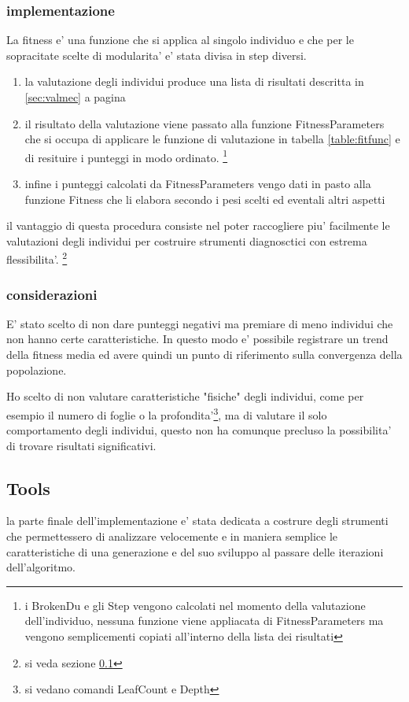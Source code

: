\documentclass[12pt, a4paper]{article}
\begin{document}
\subsubsection{implementazione}
La fitness e' una funzione che si applica al singolo individuo e che per le sopracitate scelte di modularita' e' stata divisa in step diversi.
\begin{enumerate}
\item la valutazione degli individui produce una lista di risultati descritta in \ref{sec:valmec} a pagina \pageref{sec:valmec}
\item il risultato della valutazione viene passato alla funzione FitnessParameters che si occupa di applicare le funzione di valutazione in tabella \ref{table:fitfunc} e di resituire i punteggi in modo ordinato.
\footnote{i BrokenDu e gli Step vengono calcolati nel momento della valutazione dell'individuo, nessuna funzione viene appliacata di FitnessParameters ma vengono semplicementi copiati all'interno della lista dei risultati}
\item infine i punteggi calcolati da FitnessParameters vengo dati in pasto alla funzione Fitness che li elabora secondo i pesi scelti ed eventali altri aspetti
\end{enumerate}

il vantaggio di questa procedura consiste nel poter raccogliere piu' facilmente le valutazioni degli individui per costruire strumenti diagnosctici con estrema flessibilita'.
\footnote{si veda sezione \ref{sec:tools} }

\subsubsection{considerazioni}
E' stato scelto di non dare punteggi negativi ma premiare di meno individui che non hanno certe caratteristiche. In questo modo e' possibile registrare un trend della fitness media ed avere quindi un punto di riferimento sulla convergenza della popolazione.

Ho scelto di non valutare caratteristiche "fisiche" degli individui, come per esempio il numero di foglie o la profondita'\footnote{si vedano comandi LeafCount e Depth}, ma di valutare il solo comportamento degli individui, questo non ha comunque precluso la possibilita' di trovare risultati significativi.

\subsection{Tools}
\label{sec:tools}
la parte finale dell'implementazione e' stata dedicata a costrure degli strumenti che permettessero di analizzare velocemente e in maniera semplice le caratteristiche di una generazione e del suo sviluppo al passare delle iterazioni dell'algoritmo.
\end{document}
